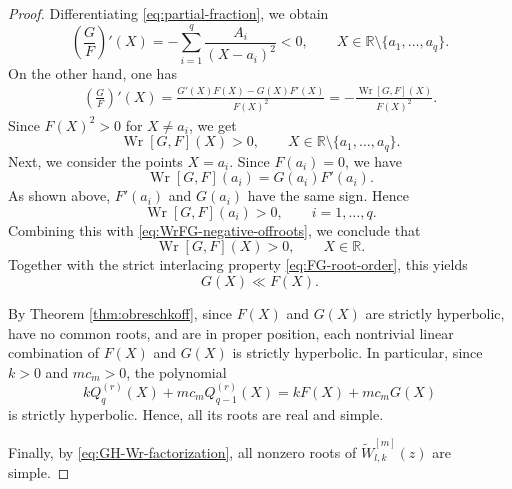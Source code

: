 \documentclass[preprint,3p,10pt]{elsarticle}
\theoremstyle{definition}
\begin{document}
\begin{proof}
Differentiating \eqref{eq:partial-fraction}, we obtain
\begin{equation}
    \left(\frac{G}{F}\right)'(X)
    =
    -\sum_{i=1}^{q}\frac{A_i}{(X-a_i)^2}<0,
    \qquad
    X\in\mathbb R\setminus\{a_1,\ldots,a_q\}.
\end{equation}
On the other hand, one has
\begin{align}
    \left(\frac{G}{F}\right)'(X)
    =
    \frac{G'(X)F(X)-G(X)F'(X)}{F(X)^2}
     =
    -\frac{\operatorname{Wr}[G,F](X)}{F(X)^2}.
\end{align}
Since \(F(X)^2>0\) for \(X\neq a_i\), we get
\begin{equation}\label{eq:WrFG-negative-offroots}
    \operatorname{Wr}[G,F](X)>0,
    \qquad
    X\in\mathbb R\setminus\{a_1,\ldots,a_q\}.
\end{equation}
Next, we consider the points \(X=a_i\). Since \(F(a_i)=0\), we have
\begin{equation}
    \operatorname{Wr}[G,F](a_i)
    =
    G(a_i)F'(a_i).
\end{equation}
As shown above, \(F'(a_i)\) and \(G(a_i)\) have the same sign. Hence
\begin{equation}
    \operatorname{Wr}[G,F](a_i)>0,
    \qquad i=1,\ldots,q.
\end{equation}
Combining this with \eqref{eq:WrFG-negative-offroots}, we conclude that
\begin{equation}
    \operatorname{Wr}[G,F](X)>0,
    \qquad X\in\mathbb R.
\end{equation}
Together with the strict interlacing property \eqref{eq:FG-root-order}, this yields
\begin{equation}\label{eq:G-proper-F}
    G(X)\ll F(X).
\end{equation}

By Theorem \ref{thm:obreschkoff}, since \(F(X)\) and \(G(X)\) are strictly hyperbolic, have no
common roots, and are in proper position, each nontrivial linear combination
of \(F(X)\) and \(G(X)\)  is strictly hyperbolic. In particular, since \(k>0\) and
\(mc_m>0\),
the polynomial
\begin{equation}
    kQ_q^{(r)}(X)+mc_mQ_{q-1}^{(r)}(X)
    =
    kF(X)+mc_mG(X)
\end{equation}
is strictly hyperbolic. Hence, all its roots are real and simple.


Finally, by \eqref{eq:GH-Wr-factorization}, all nonzero roots of $\widetilde W_{l,k}^{[m]}(z)$ are simple.

\end{proof}
\end{document}
